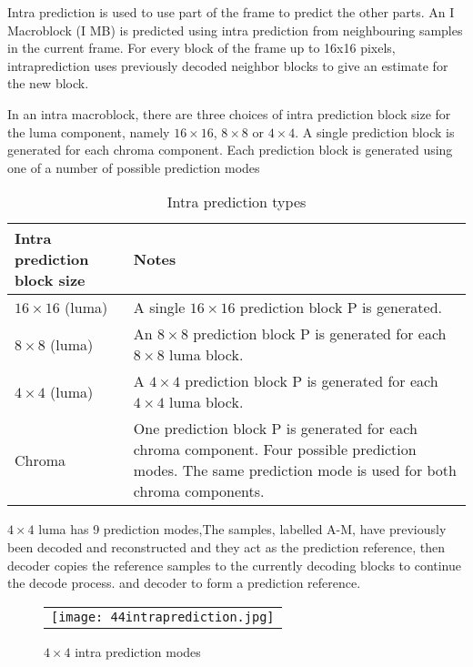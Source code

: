\documentclass[../main.tex]{subfiles}
\begin{document}
Intra prediction is used to use part of the frame
to predict the other parts. An I Macroblock (I MB) is predicted using intra prediction from neighbouring samples in the current frame. For every block of the frame up to 16x16 pixels, intraprediction uses previously decoded neighbor blocks to give an estimate for the new
block. 

In an intra macroblock, there are three choices of intra prediction block size for the luma
component, namely $16 \times 16$, $8 \times 8$ or $4 \times 4$. A single prediction block is generated for each
chroma component. Each prediction block is generated using one of a number of possible
prediction modes 

\begin{table}[ht]
\label{tab:list}
\begin{center}       
\begin{tabular}{|l|l|} 
\hline
\rule[-1ex]{0pt}{3.5ex}  Intra prediction block size & Notes\\  
\hline
\rule[-1ex]{0pt}{3.5ex}  $16 \times 16$ (luma) & A single $16 \times 16$ prediction block P is generated.   \\
\hline
\rule[-1ex]{0pt}{3.5ex}  $8 \times 8$ (luma) & An $8 \times 8$ prediction block P is generated for each $8 \times 8$ luma block.
 \\
\hline
\rule[-1ex]{0pt}{3.5ex}  $4 \times 4$ (luma) & A $4 \times 4$ prediction block P is generated for each $4 \times 4$ luma block.   \\
\hline
\rule[-1ex]{0pt}{3.5ex}  Chroma & One prediction block P is generated for each chroma component.
Four possible prediction modes. The same prediction mode is used
for both chroma components.  \\%
\hline

\end{tabular}
\end{center}
\caption{Intra prediction types} 
\end{table}

$4 \times 4$ luma has 9 prediction modes,The samples, labelled A-M, have previously been decoded and reconstructed and they act as the prediction reference, then decoder copies the reference samples to the currently decoding blocks to continue the decode process.
and decoder to form a prediction reference. 

 \begin{figure} [ht]
   \begin{center}
   \begin{tabular}{c} %
   \texttt{[image: 44intraprediction.jpg]}
   \end{tabular}
   \end{center}
   \caption[example] 
   { \label{fig:example} 
$4 \times 4$ intra prediction modes }
   \end{figure}     %
   
\end{document}
